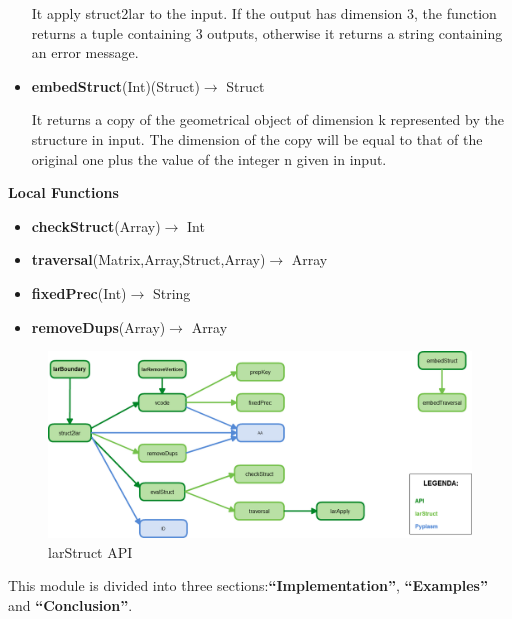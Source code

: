 \documentclass[a4paper,12pt]{article}
\begin{document}
\begin{itemize}
It apply struct2lar to the input. If the output has dimension 3, the function returns a
tuple containing 3 outputs, otherwise it returns a string containing an error message.
\item \textbf{embedStruct}(Int)(Struct)$\rightarrow$ Struct

It returns a copy of the geometrical object of dimension k represented by the structure in
input. The dimension of the copy will be equal to that of the original one plus the value
of the integer n given in input.
\end{itemize}
\textbf{Local Functions} 
\begin{itemize}
\item \textbf{checkStruct}(Array)$\rightarrow$ Int 
\item \textbf{traversal}(Matrix,Array,Struct,Array)$\rightarrow$ Array
\item \textbf{fixedPrec}(Int)$\rightarrow$ String
\item \textbf{removeDups}(Array)$\rightarrow$ Array
\end{itemize}
\begin{figure}[h!]
\includegraphics[width=17cm, scale=0.5]{larStruct.png}
\caption[API]{larStruct API}
\end{figure}
\newpage
This module is divided into three sections:\textbf{``Implementation''}, \textbf{``Examples''} and \textbf{``Conclusion''}.
\end{document}
